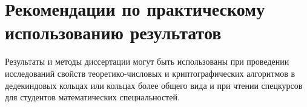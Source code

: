 \documentclass[_00_dissertation.tex]{subfiles}
\begin{document}
\section*{Рекомендации по практическому использованию результатов}

Результаты и методы диссертации могут быть использованы при проведении исследований свойств теоретико-числовых и криптографических алгоритмов в дедекиндовых кольцах или кольцах более общего вида и при чтении спецкурсов для студентов математических специальностей.

\onlyinsubfile{
    
}
\end{document}
